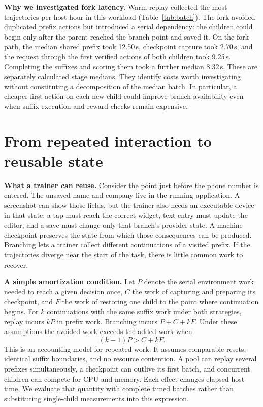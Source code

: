 \documentclass[11pt,letterpaper]{article}
\newcommand{\subhead}[1]{\par\smallskip\noindent\textbf{#1}\enspace}
\begin{document}
\subhead{Why we investigated fork latency.}
Warm replay collected the most trajectories per host-hour in this workload (Table~\ref{tab:batch}). The fork avoided duplicated prefix actions but introduced a serial dependency: the children could begin only after the parent reached the branch point and saved it. On the fork path, the median shared prefix took 12.50\,s, checkpoint capture took 2.70\,s, and the request through the first verified actions of both children took 9.25\,s. Completing the suffixes and scoring them took a further median 8.32\,s. These are separately calculated stage medians. They identify costs worth investigating without constituting a decomposition of the median batch. In particular, a cheaper first action on each new child could improve branch availability even when suffix execution and reward checks remain expensive.

\clearpage
\section{From repeated interaction to reusable state}
\subhead{What a trainer can reuse.}
Consider the point just before the phone number is entered. The unsaved name and company live in the running application. A screenshot can show those fields, but the trainer also needs an executable device in that state: a tap must reach the correct widget, text entry must update the editor, and a save must change only that branch's provider state. A machine checkpoint preserves the state from which those consequences can be produced. Branching lets a trainer collect different continuations of a visited prefix. If the trajectories diverge near the start of the task, there is little common work to recover.

\subhead{A simple amortization condition.}
Let $P$ denote the serial environment work needed to reach a given decision once, $C$ the work of capturing and preparing its checkpoint, and $F$ the work of restoring one child to the point where continuation begins. For $k$ continuations with the same suffix work under both strategies, replay incurs $kP$ in prefix work. Branching incurs $P+C+kF$. Under these assumptions the avoided work exceeds the added work when
\[
                     (k-1)P > C + kF .
\]
This is an accounting model for repeated work. It assumes comparable resets, identical suffix boundaries, and no resource contention. A pool can replay several prefixes simultaneously, a checkpoint can outlive its first batch, and concurrent children can compete for CPU and memory. Each effect changes elapsed host time. We evaluate that quantity with complete timed batches rather than substituting single-child measurements into this expression.
\end{document}
